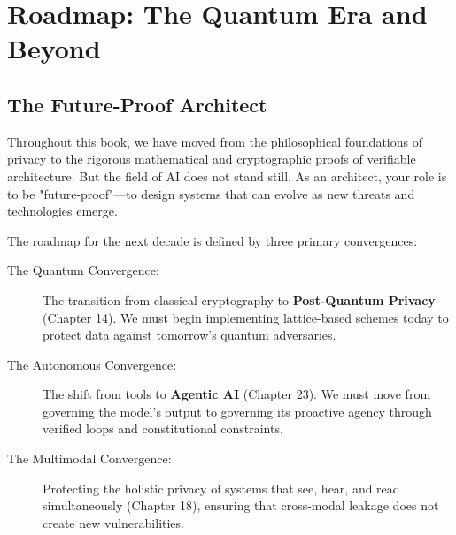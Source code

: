 
\chapter{Roadmap: The Quantum Era and Beyond}
\label{chap:roadmap_final}


\section{The Future-Proof Architect}
\label{sec:future_proof}

Throughout this book, we have moved from the philosophical foundations of privacy to the rigorous mathematical and cryptographic proofs of verifiable architecture. But the field of AI does not stand still. As an architect, your role is to be "future-proof"---to design systems that can evolve as new threats and technologies emerge.

The roadmap for the next decade is defined by three primary convergences:

\begin{description}
  \item[The Quantum Convergence:] 
        The transition from classical cryptography to \textbf{Post-Quantum Privacy} (Chapter 14). We must begin implementing lattice-based schemes today to protect data against tomorrow's quantum adversaries.
  \item[The Autonomous Convergence:]
        The shift from tools to \textbf{Agentic AI} (Chapter 23). We must move from governing the model's output to governing its proactive agency through verified loops and constitutional constraints.
  \item[The Multimodal Convergence:]
        Protecting the holistic privacy of systems that see, hear, and read simultaneously (Chapter 18), ensuring that cross-modal leakage does not create new vulnerabilities.
\end{description}

